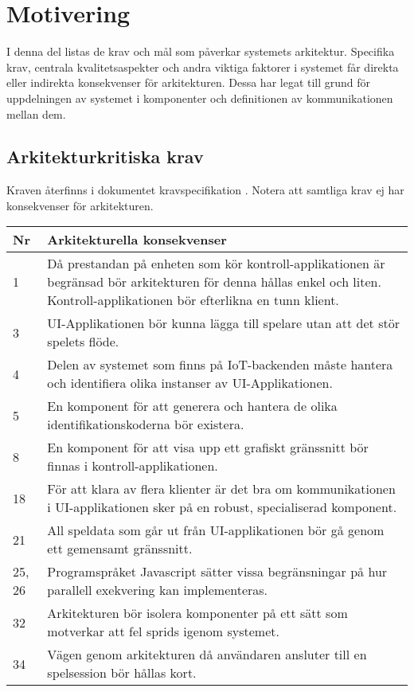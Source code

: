 \section{Motivering}
I denna del listas de krav och mål som påverkar systemets arkitektur. Specifika krav, centrala kvalitetsaspekter och andra viktiga faktorer i systemet får direkta eller indirekta konsekvenser för arkitekturen. Dessa har legat till grund för uppdelningen av systemet i komponenter och definitionen av kommunikationen mellan dem.

\subsection{Arkitekturkritiska krav}
Kraven återfinns i dokumentet kravspecifikation \cite{bib-kravspec}. Notera att samtliga krav ej har konsekvenser för arkitekturen.\\

\begin{center}
    \begin{tabular}{|p{1cm}|p{13cm}|}
        \hline
        \textbf{Nr} & \textbf{Arkitekturella konsekvenser}\\
        \hline
        1 & Då prestandan på enheten som kör kontroll-applikationen är begränsad bör arkitekturen för denna hållas enkel och liten. Kontroll-applikationen bör efterlikna en tunn klient.\\
        \hline
        3 & UI-Applikationen bör kunna lägga till spelare utan att det stör spelets flöde.\\
        \hline
        4 & Delen av systemet som finns på IoT-backenden måste hantera och identifiera olika instanser av UI-Applikationen.\\
        \hline
        5 & En komponent för att generera och hantera de olika identifikationskoderna bör existera.\\
        \hline
        8 & En komponent för att visa upp ett grafiskt gränssnitt bör finnas i kontroll-applikationen.\\
        \hline
        18 & För att klara av flera klienter är det bra om kommunikationen i UI-applikationen sker på en robust, specialiserad komponent.\\
        \hline
        21 & All speldata som går ut från UI-applikationen bör gå genom ett gemensamt gränssnitt.\\
        \hline
        25, 26 & Programspråket Javascript sätter vissa begränsningar på hur parallell exekvering kan implementeras.\\
        \hline
        32 & Arkitekturen bör isolera komponenter på ett sätt som motverkar att fel sprids igenom systemet.\\
        \hline
        34 & Vägen genom arkitekturen då användaren ansluter till en spelsession bör hållas kort.\\
        \hline
    \end{tabular}
\end{center}

